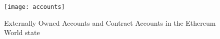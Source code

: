 \begin{figure}[H]
    \centering
    \texttt{[image: accounts]}
    \caption{Externally Owned Accounts and Contract Accounts in the Ethereum World state~\cite{visual}}
    \label{fig:accounts}
\end{figure}
